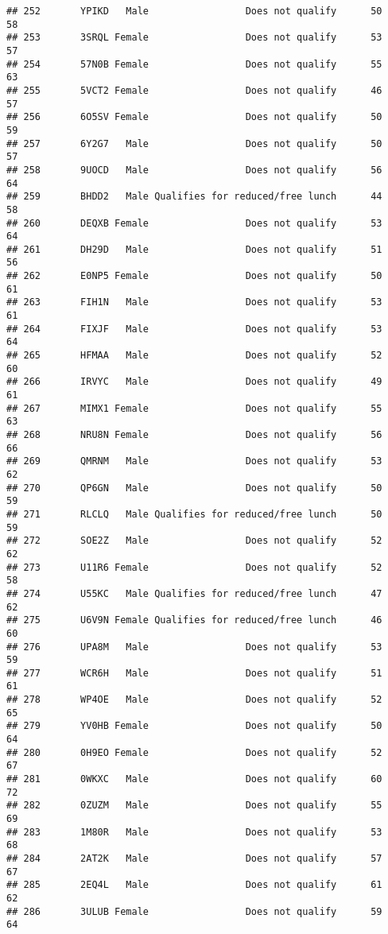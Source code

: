 \documentclass[
]{article}
\begin{document}
\begin{verbatim}
## 252       YPIKD   Male                 Does not qualify      50       58
## 253       3SRQL Female                 Does not qualify      53       57
## 254       57N0B Female                 Does not qualify      55       63
## 255       5VCT2 Female                 Does not qualify      46       57
## 256       6O5SV Female                 Does not qualify      50       59
## 257       6Y2G7   Male                 Does not qualify      50       57
## 258       9UOCD   Male                 Does not qualify      56       64
## 259       BHDD2   Male Qualifies for reduced/free lunch      44       58
## 260       DEQXB Female                 Does not qualify      53       64
## 261       DH29D   Male                 Does not qualify      51       56
## 262       E0NP5 Female                 Does not qualify      50       61
## 263       FIH1N   Male                 Does not qualify      53       61
## 264       FIXJF   Male                 Does not qualify      53       64
## 265       HFMAA   Male                 Does not qualify      52       60
## 266       IRVYC   Male                 Does not qualify      49       61
## 267       MIMX1 Female                 Does not qualify      55       63
## 268       NRU8N Female                 Does not qualify      56       66
## 269       QMRNM   Male                 Does not qualify      53       62
## 270       QP6GN   Male                 Does not qualify      50       59
## 271       RLCLQ   Male Qualifies for reduced/free lunch      50       59
## 272       SOE2Z   Male                 Does not qualify      52       62
## 273       U11R6 Female                 Does not qualify      52       58
## 274       U55KC   Male Qualifies for reduced/free lunch      47       62
## 275       U6V9N Female Qualifies for reduced/free lunch      46       60
## 276       UPA8M   Male                 Does not qualify      53       59
## 277       WCR6H   Male                 Does not qualify      51       61
## 278       WP4OE   Male                 Does not qualify      52       65
## 279       YV0HB Female                 Does not qualify      50       64
## 280       0H9EO Female                 Does not qualify      52       67
## 281       0WKXC   Male                 Does not qualify      60       72
## 282       0ZUZM   Male                 Does not qualify      55       69
## 283       1M80R   Male                 Does not qualify      53       68
## 284       2AT2K   Male                 Does not qualify      57       67
## 285       2EQ4L   Male                 Does not qualify      61       62
## 286       3ULUB Female                 Does not qualify      59       64

\end{verbatim}
\end{document}
